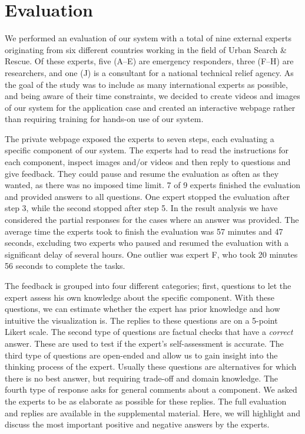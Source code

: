 \documentclass[conference,10pt,letter]{IEEEtran}
\begin{document}

\section{Evaluation} \label{sec:evaluation}
We performed an evaluation of our system with a total of nine external experts originating from six different countries working in the field of Urban Search \& Rescue. Of these experts, five (A--E) are emergency responders, three (F--H) are researchers, and one (J) is a consultant for a national technical relief agency. As the goal of the study was to include as many international experts as possible, and being aware of their time constraints, we decided to create videos and images of our system for the application case and created an interactive webpage rather than requiring training for hands-on use of our system.

The private webpage exposed the experts to seven steps, each evaluating a specific component of our system. The experts had to read the instructions for each component, inspect images and/or videos and then reply to questions and give feedback. They could pause and resume the evaluation as often as they wanted, as there was no imposed time limit. 7 of 9 experts finished the evaluation and provided answers to all questions. One expert stopped the evaluation after step 3, while the second stopped after step 5. In the result analysis we have considered the partial responses for the cases where an answer was provided. The average time the experts took to finish the evaluation was 57 minutes and 47 seconds, excluding two experts who paused and resumed the evaluation with a significant delay of several hours. One outlier was expert F, who took 20 minutes 56 seconds to complete the tasks.

The feedback is grouped into four different categories; first, questions to let the expert assess his own knowledge about the specific  component. With these questions, we can estimate whether the expert has prior knowledge and how intuitive the visualization is. The replies to these questions are on a 5-point Likert scale. The second type of questions are factual checks that have a \emph{correct} answer. These are used to test if the expert's self-assessment is accurate. The third type of questions are open-ended and allow us to gain insight into the thinking process of the expert. Usually these questions are alternatives for which there is no best answer, but requiring trade-off and domain knowledge. The fourth type of response asks for general comments about a component. We asked the experts to be as elaborate as possible for these replies. The full evaluation and replies are available in the supplemental material. Here, we will highlight and discuss the most important positive and negative answers by the experts. 
\end{document}
